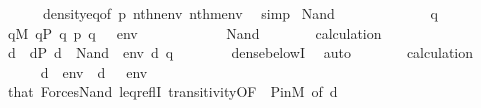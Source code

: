 \begin{isabellebody}
\ \ \ \ \ \ density{\isacharunderscore}{\kern0pt}eq{\isacharbrackleft}{\kern0pt}of\ p\ {\isachardoublequoteopen}nth{\isacharparenleft}{\kern0pt}n{\isacharcomma}{\kern0pt}env{\isacharparenright}{\kern0pt}{\isachardoublequoteclose}\ {\isachardoublequoteopen}nth{\isacharparenleft}{\kern0pt}m{\isacharcomma}{\kern0pt}env{\isacharparenright}{\kern0pt}{\isachardoublequoteclose}{\isacharbrackright}{\kern0pt}\ \isamarkupfalse%
\ simp\isanewline
{}\isamarkupfalse%
\isanewline
{}\isamarkupfalse%
\ {\isacharparenleft}{\kern0pt}Nand\ {\isasymphi}\ {\isasympsi}{\isacharparenright}{\kern0pt}\isanewline
\ \ \isacommand{{\isacharbraceleft}{\kern0pt}}\isamarkupfalse%
\ \ \isanewline
\ \ \ \ \isamarkupfalse%
\ q\isanewline
\ \ \ \ \isamarkupfalse%
\ {\isachardoublequoteopen}q{\isasymin}M{\isachardoublequoteclose}\ {\isachardoublequoteopen}q{\isasymin}P{\isachardoublequoteclose}\ {\isachardoublequoteopen}q{\isasympreceq}\ p{\isachardoublequoteclose}\ {\isachardoublequoteopen}q\ {\isasymtturnstile}\ {\isasymphi}\ env{\isachardoublequoteclose}\isanewline
\ \ \ \ \isamarkupfalse%
\ \isanewline
\ \ \ \ \isamarkupfalse%
\ Nand\isanewline
\ \ \ \ \isamarkupfalse%
\ \isamarkupfalse%
\ calculation\isanewline
\ \ \ \ \isamarkupfalse%
\ d\ \ {\isachardoublequoteopen}d{\isasymin}P{\isachardoublequoteclose}\ {\isachardoublequoteopen}d\ {\isasymtturnstile}\ Nand{\isacharparenleft}{\kern0pt}{\isasymphi}{\isacharcomma}{\kern0pt}\ {\isasympsi}{\isacharparenright}{\kern0pt}\ env{\isachardoublequoteclose}\ {\isachardoublequoteopen}d{\isasympreceq}\ q{\isachardoublequoteclose}\isanewline
\ \ \ \ \ \ \isamarkupfalse%
\ dense{\isacharunderscore}{\kern0pt}belowI\ \isamarkupfalse%
\ auto\isanewline
\ \ \ \ \isamarkupfalse%
\ \isamarkupfalse%
\ calculation\isanewline
\ \ \ \ \isamarkupfalse%
\ {\isachardoublequoteopen}{\isasymnot}{\isacharparenleft}{\kern0pt}d{\isasymtturnstile}\ {\isasympsi}\ env{\isacharparenright}{\kern0pt}{\isachardoublequoteclose}\ \ {\isachardoublequoteopen}d\ {\isasymtturnstile}\ {\isasymphi}\ env{\isachardoublequoteclose}\isanewline
\ \ \ \ \ \ \isamarkupfalse%
\ that\ Forces{\isacharunderscore}{\kern0pt}Nand\ leq{\isacharunderscore}{\kern0pt}reflI\ transitivity{\isacharbrackleft}{\kern0pt}OF\ {\isacharunderscore}{\kern0pt}\ P{\isacharunderscore}{\kern0pt}in{\isacharunderscore}{\kern0pt}M{\isacharcomma}{\kern0pt}\ of\ d{\isacharbrackright}{\kern0pt}\ \isamarkupfalse%

\end{isabellebody}
